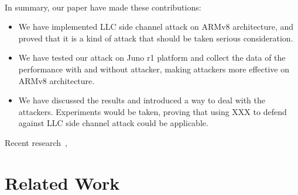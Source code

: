 \documentclass{sig-alternate}
\begin{document}
\\
\indent
In summary, our paper have made these contributions:
\begin{itemize}
  \item We have implemented LLC side channel attack on ARMv8 architecture, and proved that it is a kind of attack that should be taken serious consideration.
  \item We have tested our attack on Juno r1 platform and collect the data of the performance with and without attacker, making attackers more effective on ARMv8 architecture.
  \item We have discussed the results and introduced a way to deal with the attackers. Experiments would be taken, proving that using XXX to defend against LLC side channel attack could be applicable.
\end{itemize}
Recent research~\cite{XuCuiPeinado2015},
\section{Related Work}
\end{document}
